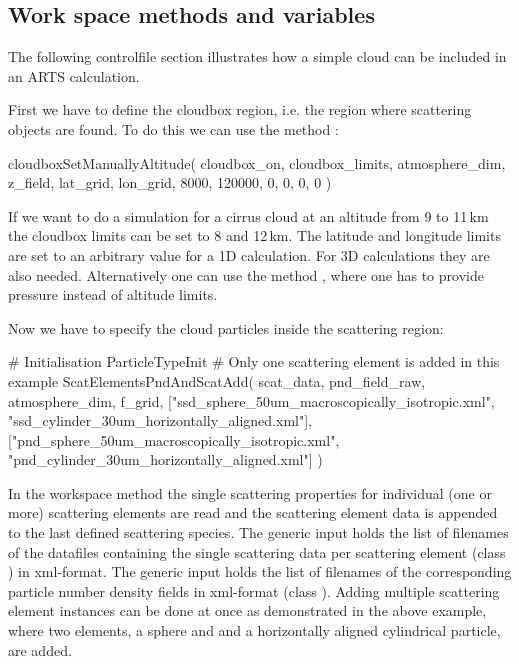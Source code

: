 \subsection{Work space methods and variables}

The following controlfile section illustrates how a simple cloud can
be included in an ARTS calculation. 

First we have to define the cloudbox region, i.e. the region where
scattering objects are found. To do this we can use the method
:
\begin{code}
cloudboxSetManuallyAltitude( cloudbox_on, cloudbox_limits,
                             atmosphere_dim, z_field,
                             lat_grid, lon_grid,
                             8000, 120000,
                             0, 0, 0, 0 )
\end{code}
If we want to do a simulation for a
cirrus cloud at an altitude from 9 to 11\,km the cloudbox limits can
be set to 8 and 12\,km. The latitude and longitude limits are set to
an arbitrary value for a 1D calculation. For 3D calculations they are
also needed. Alternatively one can use the method
, where one has to provide pressure
instead of altitude limits. 
 
Now we have to specify the cloud particles inside the scattering
region:
\begin{code}
# Initialisation
ParticleTypeInit
# Only one scattering element is added in this example 
ScatElementsPndAndScatAdd( scat_data, pnd_field_raw,
                 atmosphere_dim, f_grid,
                 ["ssd_sphere_50um_macroscopically_isotropic.xml",
                  "ssd_cylinder_30um_horizontally_aligned.xml"],
                 ["pnd_sphere_50um_macroscopically_isotropic.xml",
                  "pnd_cylinder_30um_horizontally_aligned.xml"] )
\end{code}
In the workspace method  the single
scattering properties for individual (one or more) scattering elements are read
and the scattering element data is appended to the last defined scattering
species.
The generic input  holds the list of filenames
of the datafiles containing the single scattering data per scattering element
(class ) in xml-format. The generic input
 holds the list of filenames of the
corresponding particle number density fields in xml-format (class
). Adding multiple scattering element instances can be done
at once as demonstrated in the above example, where two elements, a sphere and
and a horizontally aligned cylindrical particle, are added.

